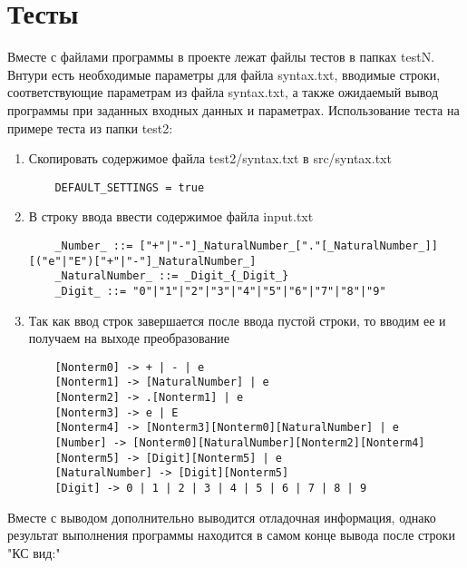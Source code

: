 \documentclass{article}
\begin{document}
\section{Тесты}
Вместе с файлами программы в проекте лежат файлы тестов в папках testN. Внтури есть необходимые параметры для файла syntax.txt,
вводимые строки, соответствующие параметрам из файла syntax.txt, а также ожидаемый вывод программы при заданных входных данных и параметрах. Использование теста на примере теста из папки test2:
\begin{enumerate}
  \item Скопировать содержимое файла test2/syntax.txt в src/syntax.txt
  \begin{lstlisting}
    DEFAULT_SETTINGS = true
    \end{lstlisting}
  \item В строку ввода ввести содержимое файла input.txt
  \begin{lstlisting}
    _Number_ ::= ["+"|"-"]_NaturalNumber_["."[_NaturalNumber_]][("e"|"E")["+"|"-"]_NaturalNumber_]
    _NaturalNumber_ ::= _Digit_{_Digit_}
    _Digit_ ::= "0"|"1"|"2"|"3"|"4"|"5"|"6"|"7"|"8"|"9"
    \end{lstlisting}
  \item Так как ввод строк завершается после ввода пустой строки, то вводим ее и получаем на выходе преобразование
    \begin{lstlisting}
    [Nonterm0] -> + | - | e
    [Nonterm1] -> [NaturalNumber] | e
    [Nonterm2] -> .[Nonterm1] | e
    [Nonterm3] -> e | E
    [Nonterm4] -> [Nonterm3][Nonterm0][NaturalNumber] | e
    [Number] -> [Nonterm0][NaturalNumber][Nonterm2][Nonterm4]
    [Nonterm5] -> [Digit][Nonterm5] | e
    [NaturalNumber] -> [Digit][Nonterm5]
    [Digit] -> 0 | 1 | 2 | 3 | 4 | 5 | 6 | 7 | 8 | 9
    \end{lstlisting}
\end{enumerate}

Вместе с выводом дополнительно выводится отладочная информация, однако результат выполнения программы находится в самом конце вывода после строки "КС вид:"
\end{document}
